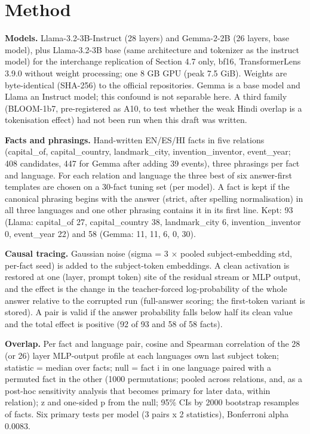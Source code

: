 \documentclass[11pt]{article}
\begin{document}
\section{Method}
\textbf{Models.} Llama-3.2-3B-Instruct (28 layers) and Gemma-2-2B (26 layers, base model), plus Llama-3.2-3B base (same architecture and tokenizer as the instruct model) for the interchange replication of Section 4.7 only, bf16, TransformerLens 3.9.0 without weight processing; one 8 GB GPU (peak 7.5 GiB). Weights are byte-identical (SHA-256) to the official repositories. Gemma is a base model and Llama an Instruct model; this confound is not separable here. A third family (BLOOM-1b7, pre-registered as A10, to test whether the weak Hindi overlap is a tokenisation effect) had not been run when this draft was written.

\textbf{Facts and phrasings.} Hand-written EN/ES/HI facts in five relations (capital\_of, capital\_country, landmark\_city, invention\_inventor, event\_year; 408 candidates, 447 for Gemma after adding 39 events), three phrasings per fact and language. For each relation and language the three best of six answer-first templates are chosen on a 30-fact tuning set (per model). A fact is kept if the canonical phrasing begins with the answer (strict, after spelling normalisation) in all three languages and one other phrasing contains it in its first line. Kept: 93 (Llama: capital\_of 27, capital\_country 38, landmark\_city 6, invention\_inventor 0, event\_year 22) and 58 (Gemma: 11, 11, 6, 0, 30).

\textbf{Causal tracing.} Gaussian noise (sigma = 3 × pooled subject-embedding std, per-fact seed) is added to the subject-token embeddings. A clean activation is restored at one (layer, prompt token) site of the residual stream or MLP output, and the effect is the change in the teacher-forced log-probability of the whole answer relative to the corrupted run (full-answer scoring; the first-token variant is stored). A pair is valid if the answer probability falls below half its clean value and the total effect is positive (92 of 93 and 58 of 58 facts).

\textbf{Overlap.} Per fact and language pair, cosine and Spearman correlation of the 28 (or 26) layer MLP-output profile at each language\textquotesingle s own last subject token; statistic = median over facts; null = fact i in one language paired with a permuted fact in the other (1000 permutations; pooled across relations, and, as a post-hoc sensitivity analysis that becomes primary for later data, within relation); z and one-sided p from the null; 95\% CIs by 2000 bootstrap resamples of facts. Six primary tests per model (3 pairs x 2 statistics), Bonferroni alpha 0.0083.
\end{document}
